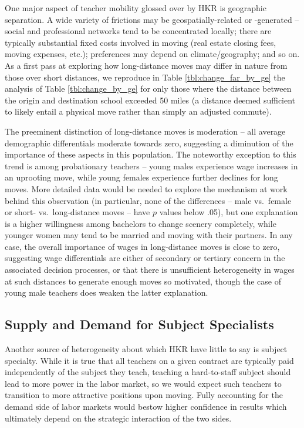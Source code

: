 \documentclass[12pt,]{article}
\begin{document}
One major aspect of teacher mobility glossed over by HKR is geographic
separation. A wide variety of frictions may be geospatially-related or
-generated -- social and professional networks tend to be concentrated
locally; there are typically substantial fixed costs involved in moving
(real estate closing fees, moving expenses, etc.); preferences may
depend on climate/geography; and so on. As a first pass at exploring how
long-distance moves may differ in nature from those over short
distances, we reproduce in Table \ref{tbl:change_far_by_ge} the analysis
of Table \ref{tbl:change_by_ge} for only those where the distance
between the origin and destination school exceeded 50 miles (a distance
deemed sufficient to likely entail a physical move rather than simply an
adjusted commute).

The preeminent distinction of long-distance moves is moderation -- all
average demographic differentials moderate towards zero, suggesting a
diminution of the importance of these aspects in this population. The
noteworthy exception to this trend is among probationary teachers --
young males experience wage increases in an uprooting move, while young
females experience further declines for long moves. More detailed data
would be needed to explore the mechanism at work behind this observation
(in particular, none of the differences -- male vs.~female or short-
vs.~long-distance moves -- have \(p\) values below .05), but one
explanation is a higher willingness among bachelors to change scenery
completely, while younger women may tend to be married and moving with
their partners. In any case, the overall importance of wages in
long-distance moves is close to zero, suggesting wage differentials are
either of secondary or tertiary concern in the associated decision
processes, or that there is unsufficient heterogeneity in wages at such
distances to generate enough moves so motivated, though the case of
young male teachers does weaken the latter explanation.

\subsection{Supply and Demand for Subject
Specialists}\label{supply-and-demand-for-subject-specialists}

Another source of heterogeneity about which HKR have little to say is
subject specialty. While it is true that all teachers on a given
contract are typically paid independently of the subject they teach,
teaching a hard-to-staff subject should lead to more power in the labor
market, so we would expect such teachers to transition to more
attractive positions upon moving. Fully accounting for the demand side
of labor markets would bestow higher confidence in results which
ultimately depend on the strategic interaction of the two sides.
\end{document}
